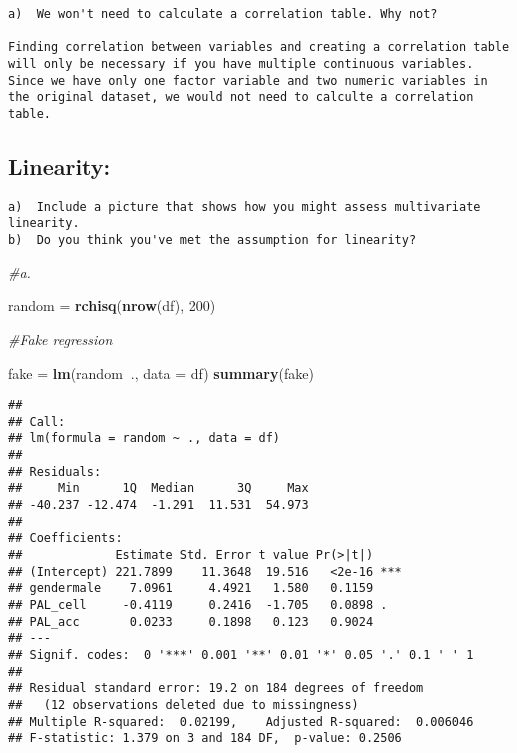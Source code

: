 \documentclass[
]{article}
\newenvironment{Shaded}{\begin{snugshade}}{\end{snugshade}}
\newcommand{\CommentTok}[1]{\textcolor[rgb]{0.56,0.35,0.01}{\textit{#1}}}
\newcommand{\DataTypeTok}[1]{\textcolor[rgb]{0.13,0.29,0.53}{#1}}
\newcommand{\DecValTok}[1]{\textcolor[rgb]{0.00,0.00,0.81}{#1}}
\newcommand{\KeywordTok}[1]{\textcolor[rgb]{0.13,0.29,0.53}{\textbf{#1}}}
\newcommand{\NormalTok}[1]{#1}
\newcommand{\OperatorTok}[1]{\textcolor[rgb]{0.81,0.36,0.00}{\textbf{#1}}}
\newcommand{\StringTok}[1]{\textcolor[rgb]{0.31,0.60,0.02}{#1}}
\begin{document}
\begin{verbatim}
a)  We won't need to calculate a correlation table. Why not?

Finding correlation between variables and creating a correlation table will only be necessary if you have multiple continuous variables. Since we have only one factor variable and two numeric variables in the original dataset, we would not need to calculte a correlation table.
\end{verbatim}

\hypertarget{linearity}{%
\subsection{Linearity:}\label{linearity}}

\begin{verbatim}
a)  Include a picture that shows how you might assess multivariate linearity.
b)  Do you think you've met the assumption for linearity?
\end{verbatim}

\begin{Shaded}
\begin{Highlighting}[]
\CommentTok{#a.}

\NormalTok{random =}\StringTok{ }\KeywordTok{rchisq}\NormalTok{(}\KeywordTok{nrow}\NormalTok{(df), }\DecValTok{200}\NormalTok{)}

\CommentTok{#Fake regression}

\NormalTok{fake =}\StringTok{ }\KeywordTok{lm}\NormalTok{(random}\OperatorTok{~}\NormalTok{., }\DataTypeTok{data =}\NormalTok{ df)}
\KeywordTok{summary}\NormalTok{(fake)}
\end{Highlighting}
\end{Shaded}

\begin{verbatim}
## 
## Call:
## lm(formula = random ~ ., data = df)
## 
## Residuals:
##     Min      1Q  Median      3Q     Max 
## -40.237 -12.474  -1.291  11.531  54.973 
## 
## Coefficients:
##             Estimate Std. Error t value Pr(>|t|)    
## (Intercept) 221.7899    11.3648  19.516   <2e-16 ***
## gendermale    7.0961     4.4921   1.580   0.1159    
## PAL_cell     -0.4119     0.2416  -1.705   0.0898 .  
## PAL_acc       0.0233     0.1898   0.123   0.9024    
## ---
## Signif. codes:  0 '***' 0.001 '**' 0.01 '*' 0.05 '.' 0.1 ' ' 1
## 
## Residual standard error: 19.2 on 184 degrees of freedom
##   (12 observations deleted due to missingness)
## Multiple R-squared:  0.02199,    Adjusted R-squared:  0.006046 
## F-statistic: 1.379 on 3 and 184 DF,  p-value: 0.2506
\end{verbatim}
\end{document}
